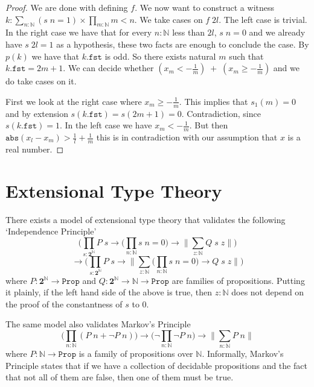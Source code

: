 \documentclass[12pt]{report}
\begin{document}
\begin{proof}
We are done with defining $f$. 
We now want to construct a witness $k : \sum_{n : \mathbb{N}}(s\;n = 1)\times \prod_{m : \mathbb{N}}m < n$. 
We take cases on $f\; 2l$. 
The left case is trivial. 
In the right case we have that for every $n :\mathbb{N}$ less than $2l$, $s\;n = 0$ and we already have $s\;2l = 1$ as a hypothesis, these two facts are enough to conclude the case. 
By $p(k)$ we have that $k.\mathtt{fst}$ is odd. 
So there exists natural $m$ such that $k.\mathtt{fst} = 2m+1$. 
We can decide whether $(x_m < -\frac{1}{m})\;+\;(x_m \geq -\frac{1}{m})$ and we do take cases on it. 

First we look at the right case where $x_m \geq -\frac{1}{m}$. 
This implies that $s_1(m) = 0$ and by extension $s(k.\mathtt{fst}) = s(2m+1) = 0$. 
Contradiction, since $s(k.\mathtt{fst}) = 1$. 
In the left case we have $x_m < -\frac{1}{m}$. 
But then $\mathtt{abs}(x_l-x_m) > \frac{1}{l} + \frac{1}{m}$ this is in contradiction with our assumption that $x$ is a real number. 
\end{proof}

\chapter{Extensional Type Theory}
There exists a model of extensional type theory that validates the following `Independence Principle'
$$\bigg( \prod_{s : \mathbf{2}^\mathbb{N}} P\; s \rightarrow \Big(\prod_{n : \mathbb{N}}s\; n = 0 \Big) \rightarrow \Big\lVert \sum_{z : \mathbb{N}} Q\; s\; z\Big\rVert \bigg)$$
$$\rightarrow \bigg( \prod_{s : \mathbf{2}^\mathbb{N}} P\; s \rightarrow  \Big\lVert \sum_{z:\mathbb{N}} \Big(\prod_{n : \mathbb{N}}s\; n = 0 \Big) \rightarrow Q \; s\;z\Big\rVert \bigg)$$
where $P: \mathbf{2}^\mathbb{N} \rightarrow \mathtt{Prop}$ and $Q : \mathbf{2}^\mathbb{N} \rightarrow \mathbb{N}\rightarrow \mathtt{Prop} $ are families of propositions. 
Putting it plainly, if the left hand side of the above is true, then $z : \mathbb{N}$ does not depend on the proof of the constantness of $s$ to $0$.

The same model also validates Markov's Principle
$$\Big(\prod_{n : \mathbb{N}}(P\; n + \neg P\; n)\Big) \rightarrow  \Big(\neg \prod_{n : \mathbb{N}}\neg P\; n\Big)\rightarrow \Big\lVert \sum_{n : \mathbb{N}} P\; n \Big\rVert$$
where $P : \mathbb{N} \rightarrow \mathtt{Prop}$ is a family of propositions over $\mathbb{N}$. 
Informally, Markov's Principle states that if we have a collection of decidable propositions and the fact that not all of them are false, then one of them must be true.
\end{document}
